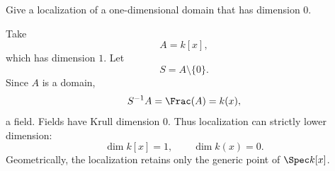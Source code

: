 \begin{problem}\label{prob:vi29-12}
Give a localization of a one-dimensional domain that has dimension \(0\).

\end{problem}

\ifdefined\FullProblemDossiers
\begin{solution}
Take
\[
A=k[x],
\]
which has dimension \(1\).  Let
\[
S=A\setminus\{0\}.
\]
Since \(A\) is a domain,
\[
S^{-1}A=\Frac(A)=k(x),
\]
a field.  Fields have Krull dimension \(0\).  Thus localization can strictly lower dimension:
\[
\dim k[x]=1,
\qquad
\dim k(x)=0.
\]
Geometrically, the localization retains only the generic point of \(\Spec k[x]\).
\end{solution}
\fi
